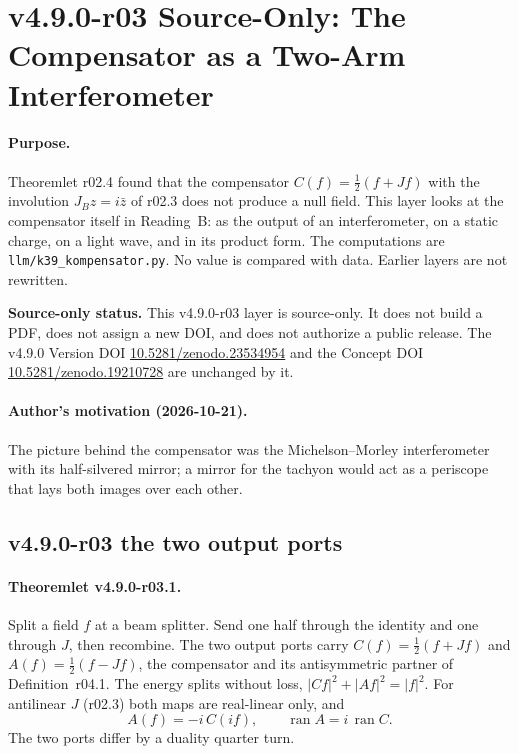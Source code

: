 \section*{v4.9.0-r03 Source-Only: The Compensator as a Two-Arm Interferometer}
\label{sec:v490-r03-compensator-interferometer}

\paragraph{Purpose.}
Theoremlet r02.4 found that the compensator \(C(f)=\tfrac12(f+Jf)\) with the involution \(J_Bz=i\bar z\) of r02.3 does
not produce a null field.  This layer looks at the compensator itself in Reading~B: as the output of an interferometer,
on a static charge, on a light wave, and in its product form.  The computations are \texttt{llm/k39\_kompensator.py}.
No value is compared with data.  Earlier layers are not rewritten.

\noindent\textbf{Source-only status.}
This v4.9.0-r03 layer is source-only.  It does not build a PDF, does not assign a new DOI,
and does not authorize a public release.  The v4.9.0 Version DOI
\href{https://doi.org/10.5281/zenodo.23534954}{10.5281/zenodo.23534954} and the Concept DOI
\href{https://doi.org/10.5281/zenodo.19210728}{10.5281/zenodo.19210728} are unchanged by it.

\paragraph{Author's motivation (2026-10-21).}
The picture behind the compensator was the Michelson--Morley interferometer with its half-silvered mirror; a mirror
for the tachyon would act as a periscope that lays both images over each other.

\subsection*{v4.9.0-r03 the two output ports}
\label{subsec:v490-r03-ports}

\paragraph{Theoremlet v4.9.0-r03.1.}
Split a field \(f\) at a beam splitter.  Send one half through the identity and one through \(J\), then recombine.  The
two output ports carry \(C(f)=\tfrac12(f+Jf)\) and \(A(f)=\tfrac12(f-Jf)\), the compensator and its antisymmetric
partner of Definition~r04.1.  The energy splits without loss, \(|Cf|^2+|Af|^2=|f|^2\).  For antilinear \(J\) (r02.3) both
maps are real-linear only, and
\[
A(f)=-i\,C(if),\qquad \operatorname{ran}A=i\,\operatorname{ran}C .
\]
The two ports differ by a duality quarter turn.

